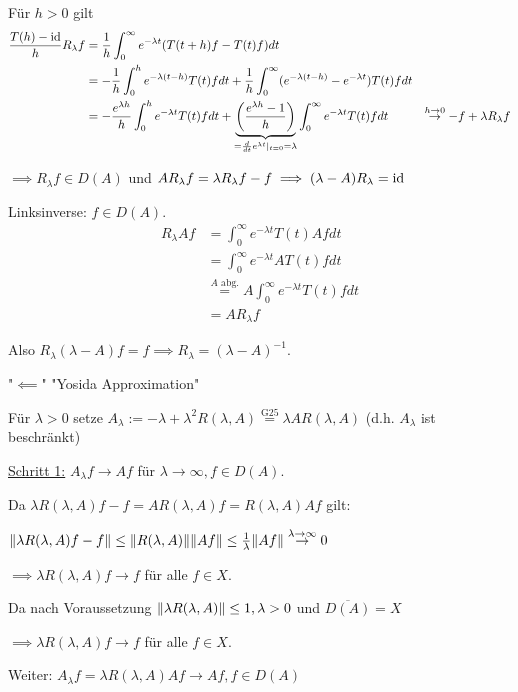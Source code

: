 Für $h > 0$ gilt
\begin{align*}
\frac{T(h) - \operatorname{id}}{h} R_\lambda f 
&= \frac{1}{h} \int_0^\infty e^{-\lambda t} (T (t + h) f - T(t) f) dt \\
&= -\frac{1}{h}\int_0^h e^{-\lambda(t - h)} T(t) f dt + \frac{1}{h} \int_0^\infty (e^{-\lambda(t - h)} - e^{-\lambda t}) T(t) f dt \\
&= -\frac{e^{\lambda h}}{h} \int_0^h e^{-\lambda t} T(t) fdt + \underbrace{\left(\frac{e^{\lambda h} - 1}{h}\right)}_{= \frac{d}{dt} e^{\lambda t}|_{t = 0} = \lambda} \int_0^\infty e^{-\lambda t} T(t) f dt
&\overset{h \to 0}{\to } -f + \lambda R_\lambda f
\end{align*}

$\implies R_\lambda f \in D(A)$ und $A R_\lambda f = \lambda R_\lambda f - f \implies (\lambda - A) R_\lambda = \operatorname{id}$

Linksinverse: $f \in D(A)$.
\begin{align*}
R_\lambda A f 
&= \int_0^\infty e^{-\lambda t} T(t) Af dt \\
&= \int_0^\infty e^{-\lambda t} A T(t) f dt \\
&\overset{A \text{ abg.}}{=} A \int_0^\infty e^{-\lambda t} T(t) f dt  \\
&= A R_\lambda f
\end{align*}

Also $R_\lambda(\lambda - A) f = f \implies R_\lambda = (\lambda - A)^{-1}$.

"$\impliedby$" "Yosida Approximation"

Für $\lambda > 0$ setze $A_\lambda := -\lambda + \lambda^2 R(\lambda, A) \overset{\text{G25}}{=} \lambda AR(\lambda, A)$ (d.h. $A_\lambda$ ist beschränkt)

\underline{Schritt 1:} $A_\lambda f \to A f$ für $\lambda \to \infty, f \in D(A)$.

Da $\lambda R(\lambda, A) f - f = AR(\lambda, A) f = R(\lambda, A) Af$ gilt:

$\lVert \lambda R(\lambda, A) f - f \rVert \leq \lVert R(\lambda, A) \rVert \lVert Af  \rVert \leq \frac{1}{\lambda} \lVert Af \rVert \overset{\lambda \to \infty}{\to} 0$

$\implies \lambda R(\lambda, A) f \to f$ für alle $f \in X$.

Da nach Voraussetzung $\lVert \lambda R(\lambda, A) \rVert \leq 1, \lambda > 0$ und $\overline{D(A)} = X$

$\implies \lambda R(\lambda, A) f \to f$ für alle $f \in X$.

Weiter: $A_\lambda f = \lambda R(\lambda, A) A f \to A f, f \in D(A)$

